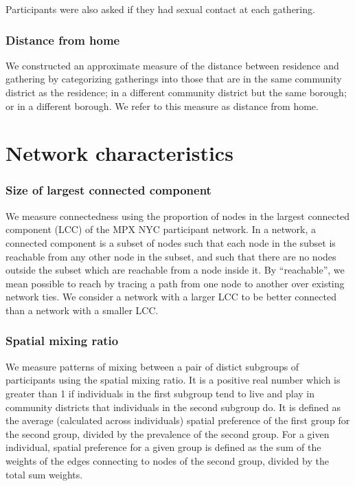 \documentclass[
  letterpaper,
  DIV=11,
  numbers=noendperiod,
  oneside]{scrreprt}
\begin{document}
Participants were also asked if they had sexual contact at each
gathering.

\hypertarget{distance-from-home}{%
\subsubsection{Distance from home}\label{distance-from-home}}

We constructed an approximate measure of the distance between residence
and gathering by categorizing gatherings into those that are in the same
community district as the residence; in a different community district
but the same borough; or in a different borough. We refer to this
measure as distance from home.

\hypertarget{network-characteristics}{%
\section{Network characteristics}\label{network-characteristics}}

\hypertarget{size-of-largest-connected-component}{%
\subsubsection{Size of largest connected
component}\label{size-of-largest-connected-component}}

We measure connectedness using the proportion of nodes in the largest
connected component (LCC) of the MPX NYC participant network. In a
network, a connected component is a subset of nodes such that each node
in the subset is reachable from any other node in the subset, and such
that there are no nodes outside the subset which are reachable from a
node inside it. By ``reachable'', we mean possible to reach by tracing a
path from one node to another over existing network ties. We consider a
network with a larger LCC to be better connected than a network with a
smaller LCC.

\hypertarget{spatial-mixing-ratio}{%
\subsubsection{Spatial mixing ratio}\label{spatial-mixing-ratio}}

We measure patterns of mixing between a pair of distict subgroups of
participants using the spatial mixing ratio. It is a positive real
number which is greater than 1 if individuals in the first subgroup tend
to live and play in community districts that individuals in the second
subgroup do. It is defined as the average (calculated across
individuals) spatial preference of the first group for the second group,
divided by the prevalence of the second group. For a given individual,
spatial preference for a given group is defined as the sum of the
weights of the edges connecting to nodes of the second group, divided by
the total sum weights.
\end{document}
